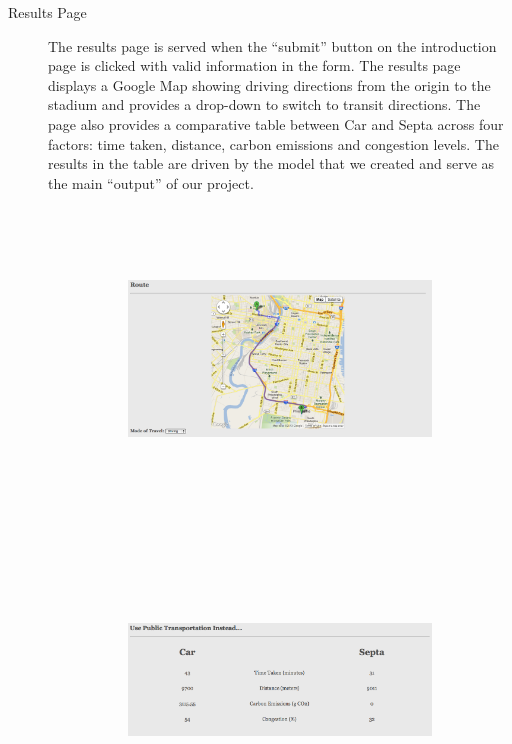 \begin{description}
    \item[Results Page] The results page is served when the ``submit''
  button on the introduction page is clicked with valid information in
  the form. The results page displays a Google Map showing driving
  directions from the origin to the stadium and provides a drop-down
  to switch to transit directions. The page also provides a
  comparative table between Car and Septa across four factors: time
  taken, distance, carbon emissions and congestion levels. The results
  in the table are driven by the model that we created and serve as
  the main ``output'' of our project.
  \begin{figure}[htp]
    \centering
    \begin{subfigure}{.4\textwidth}
      \includegraphics[height=8cm]{graphics/website/results-map.png}
      \caption{}
    \end{subfigure}
    \begin{subfigure}{.4\textwidth}
      \includegraphics[height=8cm]{graphics/website/results-table.png}
      \caption{}
    \end{subfigure}
  \end{figure}


\end{description}
